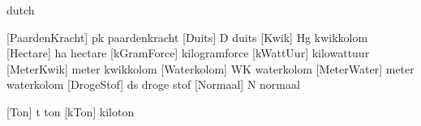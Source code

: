 
\startinterface dutch

   [PaardenKracht] {pk}                 {paardenkracht}
   [Duits]         {D}                  {duits}
   [Kwik]          {Hg}                 {kwikkolom}
   [Hectare]       {ha}                 {hectare}
   [kGramForce]    {\Kilo \Gram \Force} {kilogramforce}
   [kWattUur]      {\Kilo \Watt \Uur}   {kilowattuur}
   [MeterKwik]     {\Meter \Kwik}       {meter kwikkolom}
   [Waterkolom]    {WK}                 {waterkolom}
   [MeterWater]    {\Meter \Waterkolom} {meter waterkolom}
   [DrogeStof]     {ds}                 {droge stof}
   [Normaal]       {N}                  {normaal}

   [Ton]           {t}                  {ton}
   [kTon]          {\Kilo \Ton}         {kiloton}

  \let \OmwPerSec    \RevPerSec
  \let \OmwPerMin    \RevPerMin
  \let \Graden       \Deg
  \let \PaardeKracht \PaardenKracht
  \let \Atoom        \Atom
  \let \Heure        \Hour
  \let \Jaar         \Year
  \let \Maand        \Month
  \let \Dag          \Day
  \let \Uur          \Hour

\stopinterface


\let \Second \Sec
\let \Kubic  \Cubic
\let \IKubic \ICubic



\protect \endinput
